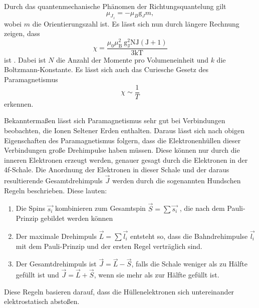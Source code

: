 Durch das quantenmechanische Phänomen der Richtungsquantelung gilt
\begin{equation}
    \mu_{J_z} = - \mu_B \text{g}_J m,
\end{equation}
wobei $m$ die Orientierungszahl ist.
Es lässt sich nun durch längere Rechnung zeigen, dass
\begin{equation}
    \chi=\frac{\mu_{0} \mu_{\mathrm{B}}^{2} \mathrm{~g}_{\mathrm{J}}^{2} \mathrm{NJ}(\mathrm{J}+1)}{3 \mathrm{kT}}
\end{equation}
ist \cite{v606}.
Dabei ist $N$ die Anzahl der Momente pro Volumeneinheit und $k$ die Boltzmann-Konstante.
Es lässt sich auch das Curiesche Gesetz des Paramagnetismus
\begin{equation}
    \chi \sim \frac{1}{T}
\end{equation}
erkennen.

Bekanntermaßen lässt sich Paramagnetismus sehr gut bei Verbindungen beobachten, die Ionen Seltener Erden enthalten.
Daraus lässt sich nach obigen Eigenschaften des Paramagnetismus folgern, dass die Elektronenhüllen dieser Verbindungen große Drehimpulse haben müssen.
Diese können nur durch die inneren Elektronen erzeugt werden, genauer gesagt durch die Elektronen in der 4f-Schale.
Die Anordnung der Elektronen in dieser Schale und der daraus resultierende Gesamtdrehimpuls $\vec{J}$ werden durch die sogenannten Hundschen Regeln beschrieben.
Diese lauten:
\begin{enumerate}
    \item Die Spins $\vec{s_i}$ kombinieren zum Gesamtspin $\vec{S} = \sum \vec{s_i}$ , die nach dem Pauli-Prinzip gebildet werden können
    \item Der maximale Drehimpuls $\vec{L} = \sum \vec{l_i}$ entsteht so, dass die Bahndrehimpulse $\vec{l_i}$ mit dem Pauli-Prinzip und der ersten Regel verträglich sind.
    \item Der Gesamtdrehimpuls ist $\vec{J} = \vec{L} - \vec{S}$, falls die Schale weniger als zu Hälfte gefüllt ist und $\vec{J} = \vec{L} + \vec{S}$, wenn sie mehr als zur Hälfte gefüllt ist.
\end{enumerate}

Diese Regeln basieren darauf, dass die Hüllenelektronen sich untereinander elektrostatisch abstoßen.


